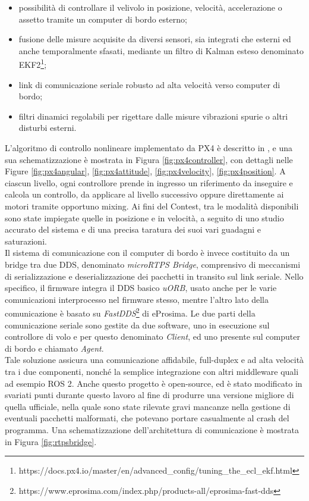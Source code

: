 \begin{itemize}
    \item possibilità di controllare il velivolo in posizione, velocità, accelerazione o assetto tramite un computer di bordo esterno;
    \item fusione delle misure acquisite da diversi sensori, sia integrati che esterni ed anche temporalmente sfasati, mediante un filtro di Kalman esteso denominato EKF2\footnote{https://docs.px4.io/master/en/advanced\_config/tuning\_the\_ecl\_ekf.html};
    \item link di comunicazione seriale robusto ad alta velocità verso computer di bordo;
    \vfill
    \item filtri dinamici regolabili per rigettare dalle misure vibrazioni spurie o altri disturbi esterni.
\end{itemize}
L'algoritmo di controllo nonlineare implementato da PX4 è descritto in \cite{px4control}, e una sua schematizzazione è mostrata in Figura \ref{fig:px4controller}, con dettagli nelle Figure \ref{fig:px4angular}, \ref{fig:px4attitude}, \ref{fig:px4velocity}, \ref{fig:px4position}. A ciascun livello, ogni controllore prende in ingresso un riferimento da inseguire e calcola un controllo, da applicare al livello successivo oppure direttamente ai motori tramite opportuno mixing. Ai fini del Contest, tra le modalità disponibili sono state impiegate quelle in posizione e in velocità, a seguito di uno studio accurato del sistema e di una precisa taratura dei suoi vari guadagni e saturazioni.\\
Il sistema di comunicazione con il computer di bordo è invece costituito da un bridge tra due DDS, denominato \emph{microRTPS Bridge}, comprensivo di meccanismi di serializzazione e deserializzazione dei pacchetti in transito sul link seriale. Nello specifico, il firmware integra il DDS basico \emph{uORB}, usato anche per le varie comunicazioni interprocesso nel firmware stesso, mentre l'altro lato della comunicazione è basato su \emph{FastDDS}\footnote{https://www.eprosima.com/index.php/products-all/eprosima-fast-dds} di eProsima. Le due parti della comunicazione seriale sono gestite da due software, uno in esecuzione sul controllore di volo e per questo denominato \emph{Client}, ed uno presente sul computer di bordo e chiamato \emph{Agent}.\\
Tale soluzione assicura una comunicazione affidabile, full-duplex e ad alta velocità tra i due componenti, nonché la semplice integrazione con altri middleware quali ad esempio ROS 2. Anche questo progetto è open-source, ed è stato modificato in svariati punti durante questo lavoro al fine di produrre una versione migliore di quella ufficiale, nella quale sono state rilevate gravi mancanze nella gestione di eventuali pacchetti malformati, che potevano portare casualmente al crash del programma. Una schematizzazione dell'architettura di comunicazione è mostrata in Figura \ref{fig:rtpsbridge}.

